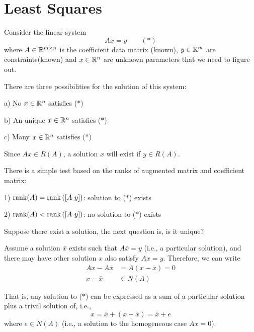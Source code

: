 



\section{Least Squares}
Consider the linear system
\begin{equation*}
Ax = y \qquad (*)
\end{equation*}
where $A\in \mathbb{R}^{m\times n}$ is the coefficient data matrix (known), $y\in \mathbb{R}^m$ are constraints(known) and $x\in \mathbb{R}^n$ are unknown parameters that we need to figure out.

There are three possibilities for the solution of this system:

a) No $x\in \mathbb{R}^n$ satisfies ($*$) 
	
b) An unique $x\in \mathbb{R}^n$ satisfies ($*$) 
	
c) Many $x\in \mathbb{R}^n$ satisfies ($*$) 

\vspace{0.3cm}
Since $Ax\in R(A)$, a solution $x$ will exist if $y\in R(A)$.

There is a simple test based on the ranks of augmented matrix and coefficient matrix:

1) $\operatorname{rank}(A) = \operatorname{rank}\left([A\ y] \right)$: solution to ($*$) exists

2) $\operatorname{rank}(A) < \operatorname{rank}\left([A\ y] \right)$: no solution to ($*$) exists

\vspace{0.4cm}
Suppose there exist a solution, the next question is, is it unique?

Assume a solution $\bar{x}$ exists such that $A\bar{x} = y$ (i.e., a particular solution), and there may have other solution $x$ also satisfy $Ax = y$. Therefore, we can write
\begin{align*}
Ax - A\bar{x} &= A(x -\bar{x}) = 0\\
x - \bar{x} &\in N(A)
\end{align*}

That is, any solution to ($*$) can be expressed as a sum of a particular solution plus a trival solution of, i.e.,
\begin{equation*}
x = \bar{x} + (x - \bar{x}) = \bar{x} + e
\end{equation*}
where $e\in N(A)$ (i.e., a solution to the homogeneous case $Ax = 0$).

